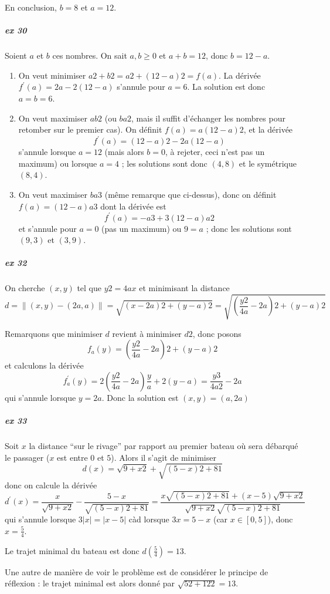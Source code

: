 En conclusion, $b = 8$ et $a = 12$.

\subparagraph{ex 30} Soient $a$ et $b$ ces nombres. On sait $a, b \geq
0$ et $a+b = 12$, donc $b = 12 - a$.
\begin{enumerate}
\item On veut minimiser $a2+ b2 = a2 + (12-a)2 = f(a)$. La dérivée
  $f^\prime(a) = 2a - 2 (12 - a)$ s'annule pour $a = 6$. La solution
  est donc $a = b = 6$.

\item On veut maximiser $a b2$ (ou $ba2$, mais il suffit d'échanger
  les nombres pour retomber sur le premier cas). On définit $f(a) = a
  (12-a)2$, et la dérivée
  \begin{equation*}
    f^\prime(a) = (12-a)2 - 2 a (12-a)
  \end{equation*}
  s'annule lorsque $a = 12$ (mais alors $b = 0$, à rejeter, ceci n'est
  pas un maximum) ou lorsque $a = 4$ ; les solutions sont donc $(4,8)$
  et le symétrique $(8,4)$.

\item On veut maximiser $ba3$ (même remarque que ci-dessus), donc on
  définit
  \begin{math}
    f(a) = (12-a) a3
  \end{math}
  dont la dérivée est
  \begin{equation*}
    f^\prime(a) = -a3 + 3 (12-a)a2
  \end{equation*}
  et s'annule pour $a = 0$ (pas un maximum) ou $9 = a$ ; donc les
  solutions sont $(9,3)$ et $(3,9)$.
\end{enumerate}

\subparagraph{ex 32}
On cherche $(x,y)$ tel que $y2 = 4ax$ et minimisant la distance
\begin{equation*}
d = \| (x,y)-(2a,a) \| = \sqrt{(x-2a)2 + (y-a)2} =
\sqrt{\left(\frac{y2}{4a}-2a\right)2 + (y-a)2}
\end{equation*}

Remarquons que minimiser $d$ revient à minimiser $d2$, donc posons
\begin{equation*}
f_a(y) = \left(\frac{y2}{4a}-2a\right)2 + (y-a)2
\end{equation*}
et calculons la dérivée
\begin{equation*}
  f_a^\prime(y)  = 2 \left(\frac{y2}{4a}-2a\right) \frac y a + 2
  (y-a) = \frac{y3}{4a2}-2a
\end{equation*}
qui s'annule lorsque $y = 2a$. Donc la solution est $(x,y) = (a,2a)$

\subparagraph{ex 33}
Soit $x$ la distance ``sur le rivage'' par rapport au premier bateau
où sera débarqué le passager ($x$ est entre $0$ et $5$). Alors il
s'agit de minimiser
\begin{equation*}
  d(x) = \sqrt{9+x2} + \sqrt{(5-x)2 + 81}
\end{equation*}
donc on calcule la dérivée
\begin{equation*}
  d^\prime(x) = \frac{x}{\sqrt{9+x2}} - \frac{5-x}{\sqrt{(5-x)2 + 81}}
 = \frac{x\sqrt{(5-x)2 + 81} + (x-5)\sqrt{9+x2}}{\sqrt{9+x2}\sqrt{(5-x)2 + 81}}
\end{equation*}
qui s'annule lorsque $3 |x| = |x-5|$ càd lorsque $3x = 5 - x$
(car $x \in [0,5]$), donc $x = \frac{5}{4}$.

Le trajet minimal du bateau est donc $d(\frac{5}{4}) = 13$.

Une autre de manière de voir le problème est de considérer le principe
de réflexion : le trajet minimal est alors donné par $\sqrt{52 +
  122} = 13$.
